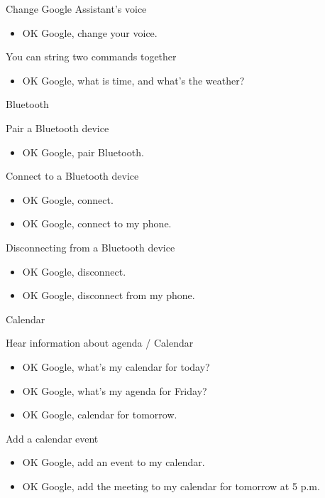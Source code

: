 \documentclass[
  a4paper,
]{article}
\providecommand{\tightlist}{%
  \setlength{\itemsep}{0pt}\setlength{\parskip}{0pt}}\usepackage{longtable,booktabs,array}
\begin{document}
Change Google Assistant's voice

\begin{itemize}
\tightlist
\item
  OK Google, change your voice.
\end{itemize}

You can string two commands together~~

\begin{itemize}
\tightlist
\item
  OK Google, what is time, and what's the weather?
\end{itemize}

Bluetooth

Pair a Bluetooth device

\begin{itemize}
\tightlist
\item
  OK Google, pair Bluetooth.
\end{itemize}

Connect to a Bluetooth device

\begin{itemize}
\tightlist
\item
  OK Google, connect.
\item
  OK Google, connect to my phone.
\end{itemize}

Disconnecting from a Bluetooth device

\begin{itemize}
\tightlist
\item
  OK Google, disconnect.
\item
  OK Google, disconnect from my phone.
\end{itemize}

Calendar

Hear information about agenda / Calendar

\begin{itemize}
\tightlist
\item
  OK Google, what's my calendar for today?
\item
  OK Google, what's my agenda for Friday?
\item
  OK Google, calendar for tomorrow.
\end{itemize}

Add a calendar event

\begin{itemize}
\tightlist
\item
  OK Google, add an event to my calendar.
\item
  OK Google, add the meeting to my calendar for tomorrow at 5 p.m.
\end{itemize}
\end{document}
